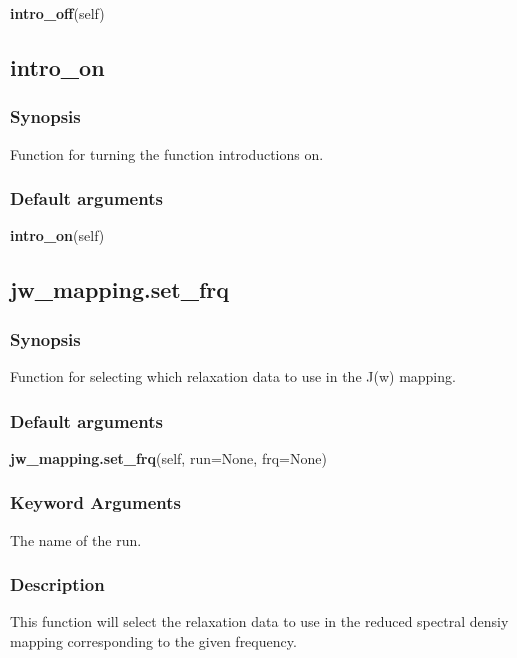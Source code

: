 \textsf{\textbf{intro\_off}(self)}



\newpage

\subsection{intro\_on}


\subsubsection{Synopsis}

Function for turning the function introductions on.

\subsubsection{Default arguments}

\textsf{\textbf{intro\_on}(self)}



\newpage

\subsection{jw\_mapping.set\_frq}


\subsubsection{Synopsis}

Function for selecting which relaxation data to use in the J(w) mapping.

\subsubsection{Default arguments}

\textsf{\textbf{jw\_mapping.set\_frq}(self, run=None, frq=None)}


\subsubsection{Keyword Arguments}

  The name of the run.


\subsubsection{Description}

This function will select the relaxation data to use in the reduced spectral densiy mapping
corresponding to the given frequency.


